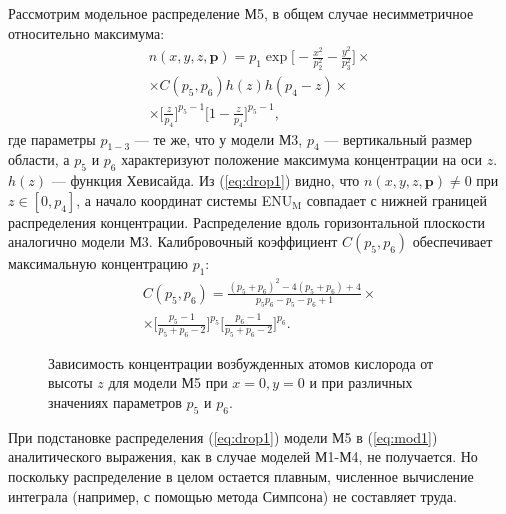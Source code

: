 \documentclass[12pt,a4paper]{article}
\renewcommand{\vec}{\mathbf}
\begin{document}
Рассмотрим модельное распределение М5, в общем случае несимметричное относительно максимума:
\begin{equation}\label{eq:drop1}
\begin{split}
n(x,y,z,\vec{p})=p_1 \exp{\bigg[-\frac{x^2}{p_2^2}-\frac{y^2}{p_3^2}\bigg]} \times \\
\times C(p_5,p_6) h(z) h(p_4-z) \times \\
\times \bigg[\frac{z}{p_4}\bigg]^{p_5-1}
\bigg[1-\frac{z}{p_4}\bigg]^{p_5-1},
\end{split}
\end{equation}
где параметры $p_{1-3}$ --- те же, что у модели М3, $p_4$ --- вертикальный размер области, а $p_5$ и $p_6$ характеризуют положение максимума концентрации на оси $z$. $h(z)$ --- функция Хевисайда. Из (\ref{eq:drop1}) видно, что $n(x,y,z,\vec{p})\neq 0$ при $z\in [0,p_4]$, а начало координат системы ENU$_\text{M}$ совпадает с нижней границей распределения концентрации. Распределение вдоль горизонтальной плоскости аналогично модели М3. Калибровочный коэффициент $C(p_5,p_6)$ обеспечивает максимальную концентрацию $p_1$:
\begin{equation}\label{eq:drop2}
\begin{split}
C(p_5,p_6)=\frac{(p_5+p_6)^2 -4(p_5+p_6)+4 }{p_5p_6-p_5-p_6+1} \times \\
\times \bigg[ \frac{p_5-1}{p_5+p_6-2}  \bigg] ^{p_5}
\bigg[ \frac{p_6-1}{p_5+p_6-2}  \bigg] ^{p_6}.
\end{split}
\end{equation}

\begin{figure}[h]
	\caption{Зависимость концентрации возбужденных атомов кислорода от высоты $z$ для модели М5 при $x=0, y=0$ и при различных значениях параметров $p_5$ и $p_6$.}
	\label{fig:fig6}
\end{figure}

При подстановке распределения (\ref{eq:drop1}) модели М5 в (\ref{eq:mod1}) аналитического выражения, как в случае моделей М1-М4, не получается. Но поскольку распределение в целом остается плавным, численное вычисление интеграла (например, с помощью метода Симпсона) не составляет труда.  
\end{document}
